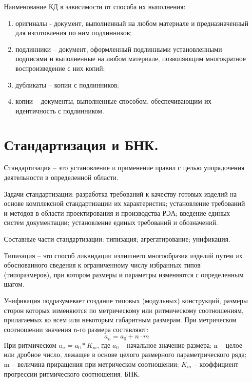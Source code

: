 \documentclass[unicode, 12pt, a4paper, oneside]{article}
\begin{document}
Наименование КД в зависимости от способа их выполнения:
\begin{enumerate}
\item оригиналы - документ,  выполненный на  любом материале и предназначенный для изготовления по ним подлинников;
\item подлинники – документ, оформленный подлинными установленными подписями и выполненные на любом материале, позволяющим многократное воспроизведение с них копий;
\item дубликаты – копии с подлинников; 
\item копии – документы, выполненные способом, обеспечивающим их идентичность с подлинником.
\end{enumerate}


\section{Стандартизация и БНК.}

Стандартизация – это установление и применение правил с целью упорядочения деятельности в определенной области.

Задачи стандартизации: разработка требований к качеству готовых изделий на основе комплексной стандартизации их характеристик; установление требований и методов в области проектирования и производства РЭА; введение единых систем документации; установление единых требований и обозначений.

Составные части стандартизации: типизация; агрегатирование; унификация.

Типизация – это способ ликвидации излишнего многообразия изделий путем их обоснованного сведения к ограниченному числу избранных типов (типоразмеров), при котором размеры и параметры изменяются с определенным шагом.

Унификация подразумевает создание типовых (модульных) конструкций, размеры сторон которых изменяются по метрическому или ритмическому соотношениям, прилагаемых ко всем или некоторым габаритным размерам. При метрическом соотношении значения n-го размера составляют:
\begin{equation}
a_n=a_0+n \cdot m
\end{equation}
При ритмическом $a_n=a_0*K_m$, где $a_0$ – начальное значение размера; n – целое или дробное число, лежащее в основе целого размерного параметрического ряда; m – величина приращения при метрическом соотношении; $K_m$ – коэффициент прогрессии ритмического соотношения.
БНК. 
\end{document}
